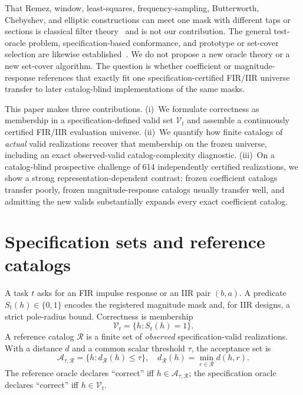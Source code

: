 \documentclass{article}
\begin{document}
That Remez, window, least-squares, frequency-sampling, Butterworth,
Chebyshev, and elliptic constructions can meet one mask with
different taps or sections is classical filter
theory~\cite{kaiser1974window,harris1978windows,rabiner1970freqsamp,parks1972chebyshev,mcclellan1973computer,rabiner1975fir,herrmann1973linear,butterworth1930,constantinides1970,jackson1996filters,antoniou2006filters}
and is not our contribution.
The general test-oracle problem, specification-based conformance,
and prototype or set-cover selection are likewise
established~\cite{weyuker1982nontestable,barr2015oracle,huuhtanen2015dsp,hart1968cnn,chvatal1979setcover}.
We do not propose a new oracle theory or a new set-cover algorithm.
The question is whether coefficient or magnitude-response
references that exactly fit one specification-certified FIR/IIR
universe transfer to later catalog-blind implementations of the
same masks.

This paper makes three contributions.
(i)~We formulate correctness as membership in a
specification-defined valid set $\mathcal{V}_t$ and assemble a
continuously certified FIR/IIR evaluation universe.
(ii)~We quantify how finite catalogs of \emph{actual} valid
realizations recover that membership on the frozen universe,
including an exact observed-valid catalog-complexity diagnostic.
(iii)~On a catalog-blind prospective challenge of 614 independently
certified realizations, we show a strong
representation-dependent contrast: frozen coefficient catalogs
transfer poorly, frozen magnitude-response catalogs usually
transfer well, and admitting the new valids substantially expands
every exact coefficient catalog.

\section{Specification sets and reference catalogs}
\label{sec:form}

A task $t$ asks for an FIR impulse response or an IIR pair
$(b,a)$.
A predicate $S_t(h)\in\{0,1\}$ encodes the registered magnitude
mask and, for IIR designs, a strict pole-radius bound.
Correctness is membership
\begin{equation}
\mathcal{V}_t=\{h:S_t(h)=1\}.
\label{eq:vt}
\end{equation}
A reference catalog $\mathcal{R}$ is a finite set of
\emph{observed} specification-valid realizations.
With a distance $d$ and a common scalar threshold $\tau$, the
acceptance set is
\begin{equation}
\mathcal{A}_{\tau,\mathcal{R}}=\{h:d_{\mathcal{R}}(h)\le\tau\},
\quad
d_{\mathcal{R}}(h)=\min_{r\in\mathcal{R}}d(h,r).
\label{eq:A}
\end{equation}
The reference oracle declares ``correct'' iff
$h\in\mathcal{A}_{\tau,\mathcal{R}}$; the specification oracle
declares ``correct'' iff $h\in\mathcal{V}_t$.
\end{document}
